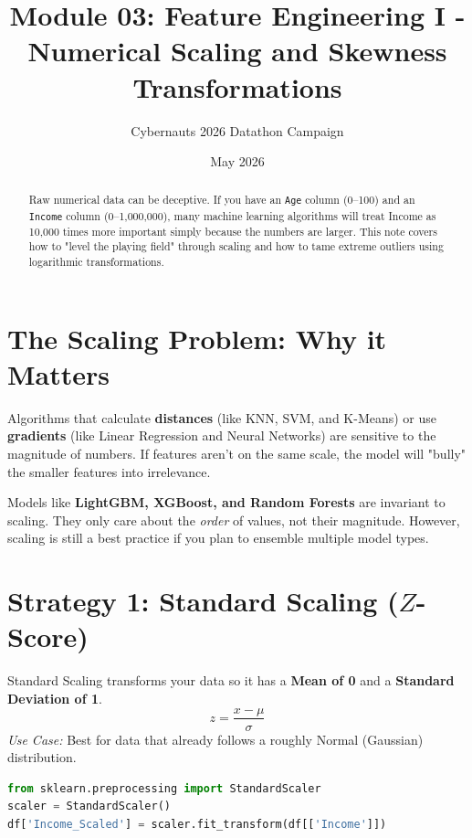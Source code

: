 \documentclass{article}
\title{Module 03: Feature Engineering I - Numerical Scaling and Skewness Transformations}
\author{Cybernauts 2026 Datathon Campaign}
\date{May 2026}
\begin{document}
\maketitle

\begin{abstract}
Raw numerical data can be deceptive. If you have an \texttt{Age} column (0--100) and an \texttt{Income} column (0--1,000,000), many machine learning algorithms will treat Income as 10,000 times more important simply because the numbers are larger. This note covers how to "level the playing field" through scaling and how to tame extreme outliers using logarithmic transformations.
\end{abstract}

\tableofcontents
\newpage

\section{The Scaling Problem: Why it Matters}
Algorithms that calculate \textbf{distances} (like KNN, SVM, and K-Means) or use \textbf{gradients} (like Linear Regression and Neural Networks) are sensitive to the magnitude of numbers. If features aren't on the same scale, the model will "bully" the smaller features into irrelevance.

\begin{tcolorbox}[colback=blue!5!white,colframe=blue!75!black,title=Tree-Based Exception]
Models like \textbf{LightGBM, XGBoost, and Random Forests} are invariant to scaling. They only care about the \textit{order} of values, not their magnitude. However, scaling is still a best practice if you plan to ensemble multiple model types.
\end{tcolorbox}

\section{Strategy 1: Standard Scaling ($Z$-Score)}
Standard Scaling transforms your data so it has a \textbf{Mean of 0} and a \textbf{Standard Deviation of 1}.
\begin{equation}
    z = \frac{x - \mu}{\sigma}
\end{equation}
\textit{Use Case:} Best for data that already follows a roughly Normal (Gaussian) distribution.

\begin{lstlisting}[language=Python]
from sklearn.preprocessing import StandardScaler
scaler = StandardScaler()
df['Income_Scaled'] = scaler.fit_transform(df[['Income']])
\end{lstlisting}
\end{document}
